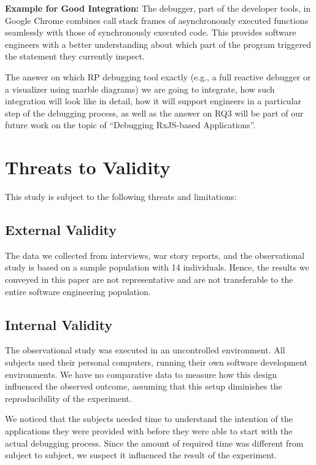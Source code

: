\documentclass[sigplan,screen]{acmart}
\begin{document}
\begin{tcolorbox}[colback=white,boxrule=1pt,sharp corners=all,left=1.8mm,boxsep=1mm]
	\textbf{Example for Good Integration:} The debugger, part of the developer tools, in Google Chrome combines call stack frames of asynchronously executed functions\cite{chromeasync} seamlessly with those of synchronously executed code. This provides software engineers with a better understanding about which part of the program triggered the statement they currently inspect.
\end{tcolorbox}

The answer on which RP debugging tool exactly (e.g., a full reactive debugger or a visualizer using marble diagrams) we are going to integrate, how such integration will look like in detail, how it will support engineers in a particular step of the debugging process, as well as the answer on RQ3 will be part of our future work on the topic of ``Debugging RxJS-based Applications''.


\section{Threats to Validity}
\label{sec:threats}

This study is subject to the following threats and limitations:

\subsection{External Validity}

The data we collected from interviews, war story reports, and the observational study is based on a sample population with 14 individuals. Hence, the results we conveyed in this paper are not representative and are not transferable to the entire software engineering population.

\subsection{Internal Validity}

The observational study was executed in an uncontrolled environment. All subjects used their personal computers, running their own software development environments. We have no comparative data to measure how this design influenced the observed outcome, assuming that this setup diminishes the reproducibility of the experiment.

We noticed that the subjects needed time to understand the intention of the applications they were provided with before they were able to start with the actual debugging process. Since the amount of required time was different from subject to subject, we suspect it influenced the result of the experiment.
\end{document}
